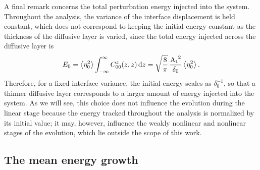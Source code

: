 A final remark concerns the total perturbation energy injected into the system. Throughout the analysis, the variance of the interface displacement is held constant, which does not correspond to keeping the initial energy constant as the thickness of the diffusive layer is varied, since the total energy injected across the diffusive layer is
\begin{equation}
    E_0
    =
    \left\langle \eta_0^2 \right\rangle
    \int_{-\infty}^{\infty}
        C_{00}^{z}(z,z)
    \,\mathrm{d}z
    =
    \sqrt{\frac{8}{\pi}}\,
    \frac{\mathrm{A_t}^2}{\delta_0}
    \left\langle \eta_0^2 \right\rangle.
    \label{eq:integrated_initial_density_variance}
\end{equation}
Therefore, for a fixed interface variance, the initial energy scales as \(\delta_0^{-1}\), so that a thinner diffusive layer corresponds to a larger amount of energy injected into the system. As we will see, this choice does not influence the evolution during the linear stage because the energy tracked throughout the analysis is normalized by its initial value; it may, however, influence the weakly nonlinear and nonlinear stages of the evolution, which lie outside the scope of this work.

\subsection{The mean energy growth}
\label{subsec:mean_energy_growth}

